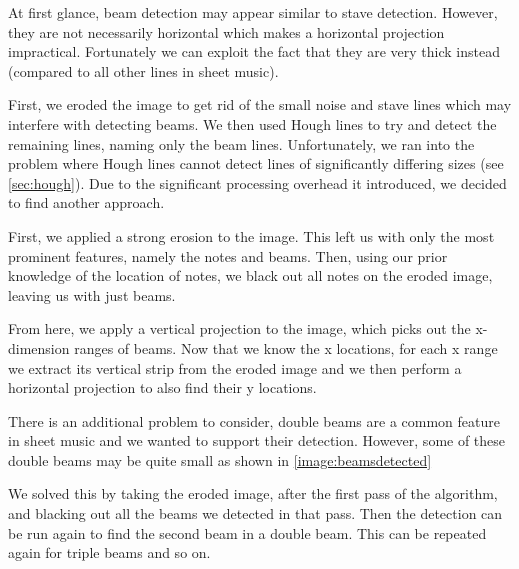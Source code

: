 At first glance, beam detection may appear similar to stave detection. However, they are not necessarily horizontal which makes a horizontal projection impractical. Fortunately we can exploit the fact that they are very thick instead (compared to all other lines in sheet music).

First, we eroded the image to get rid of the small noise and stave lines which may interfere with detecting beams. We then used Hough lines to try and detect the remaining lines, naming only the beam lines. Unfortunately, we ran into the problem where Hough lines cannot detect lines of significantly differing sizes (see \autoref{sec:hough}). Due to the significant processing overhead it introduced, we decided to find another approach.

First, we applied a strong erosion to the image. This left us with only the most prominent features, namely the notes and beams. Then, using our prior knowledge of the location of notes, we black out all notes on the eroded image, leaving us with just beams.

From here, we apply a vertical projection to the image, which picks out the x-dimension ranges of beams. Now that we know the x locations, for each x range we extract its vertical strip from the eroded image and we then perform a horizontal projection to also find their y locations.

There is an additional problem to consider, double beams are a common feature in sheet music and we wanted to support their detection. However, some of these double beams may be quite small as shown in \ref{image:beamsdetected} 


We solved this by taking the eroded image, after the first pass of the algorithm, and blacking out all the beams we detected in that pass. Then the detection can be run again to find the second beam in a double beam. This can be repeated again for triple beams and so on.


